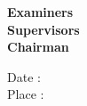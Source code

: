 \vspace{0.1in}
\begin{flushright}
\textbf{Examiners} \\
\vspace{1.5in}
\textbf{Supervisors}\\
\vspace{1.5in}
 \textbf{Chairman}\\

\end{flushright}
\vspace{0.7in}
Date :    \\
Place :\\
%

